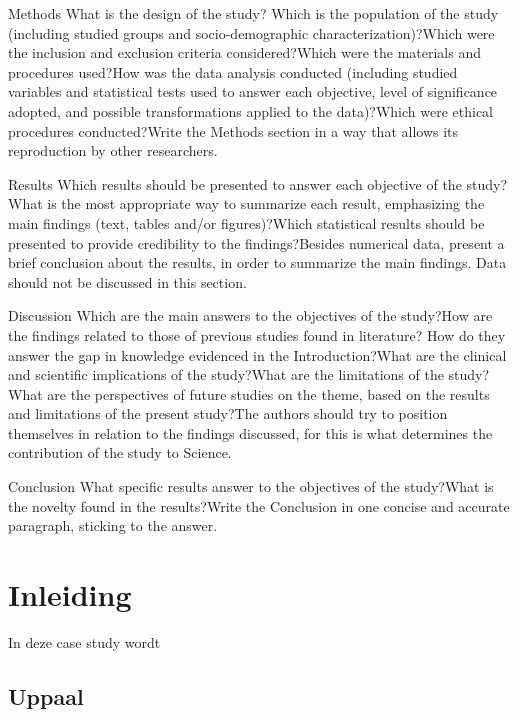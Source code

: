 \documentclass{article}
\begin{document}
Methods
What is the design of the study? Which is the population of the study (including studied groups and socio-demographic characterization)?Which were the inclusion and exclusion criteria considered?Which were the materials and procedures used?How was the data analysis conducted (including studied variables and statistical tests used to answer each objective, level of significance adopted, and possible transformations applied to the data)?Which were ethical procedures conducted?Write the Methods section in a way that allows its reproduction by other researchers. 

Results
Which  results  should  be  presented  to  answer  each  objective  of  the study?What  is  the  most  appropriate  way  to  summarize  each  result,  emphasizing the main findings (text, tables and/or figures)?Which statistical results should be presented to provide credibility to the findings?Besides  numerical  data,  present  a  brief  conclusion  about  the  results, in order to summarize the main findings. Data should not be discussed in this section.

Discussion
Which are the main answers to the objectives of the study?How are the findings related to those of previous studies found in literature? How do they answer the gap in knowledge evidenced in the Introduction?What are the clinical and scientific implications of the study?What are the limitations of the study?What are the perspectives of future studies on the theme, based on the results and limitations of the present study?The  authors  should  try  to  position  themselves  in  relation  to  the  findings discussed, for this is what determines the contribution of the study to Science.

Conclusion
What specific results answer to the objectives of the study?What is the novelty found in the results?Write  the  Conclusion  in  one  concise  and  accurate  paragraph,  sticking to the answer. 



	\newpage
	\tableofcontents
	
	\newpage
	\section{Inleiding}
	In deze case study wordt %
	
	
	
	\subsection{Uppaal}
	
\end{document}
